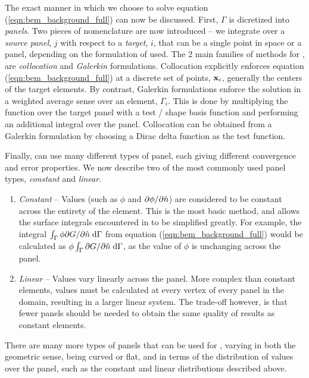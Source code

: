 The exact manner in which we choose to solve equation (\ref{eqn:bem_background_full}) can  now be discussed. First, $\Gamma$ is dicretized into \emph{panels}. Two pieces of nomenclature are now introduced -- we integrate over a \emph{source panel}, $j$ with respect to a \emph{target}, $i$, that can be a single point in space or a panel, depending on the formulation of {\bem} used. The 2 main families of methods for {\bem}, are \emph{collocation} and \emph{Galerkin} formulations. Collocation explicitly enforces equation (\ref{eqn:bem_background_full}) at a discrete set of points, $\mathbf{x}_i$, generally the centers of the target elements. By contrast, Galerkin formulations enforce the solution in a weighted average sense over an element, $\Gamma_i$. This is done by multiplying the function over the target panel with a test / shape basis function and performing an additional integral over the panel. Collocation {\bem} can be obtained from a Galerkin formulation by choosing a Dirac delta function as the test function.

Finally, {\bem} can use many different types of panel, each giving different convergence and error properties. We now describe two of the most commonly used panel types, \emph{constant} and \emph{linear}. \cite{BrebbiaDominguez1992}

\begin{enumerate}
\item \emph{Constant} -- Values (such as $\phi$ and $\partial \phi / \partial \hat{n}$) are considered to be constant across the entirety of the element. This is the most basic method, and allows the surface integrals encountered in {\bem} to be simplified greatly. For example, the integral $\int_{\Gamma} \phi\partial G / \partial \hat{n}\;\text{d}\Gamma$ from equation (\ref{eqn:bem_background_full}) would be calculated as $\phi\int_{\Gamma}\partial G / \partial \hat{n}\;\text{d}\Gamma$, as the value of $\phi$ is unchanging across the panel. %

\item \emph{Linear} -- Values vary linearly across the panel. More complex than constant elements, values must be calculated at every vertex of every panel in the domain, resulting in a larger linear system. The trade-off however, is that fewer panels should be needed to obtain the same quality of results as constant elements. 
\end{enumerate}

There are many more types of panels that can be used for {\bem}, varying in both the geometric sense, being curved or flat, and in terms of the distribution of values over the panel, such as the constant and linear distributions described above.

